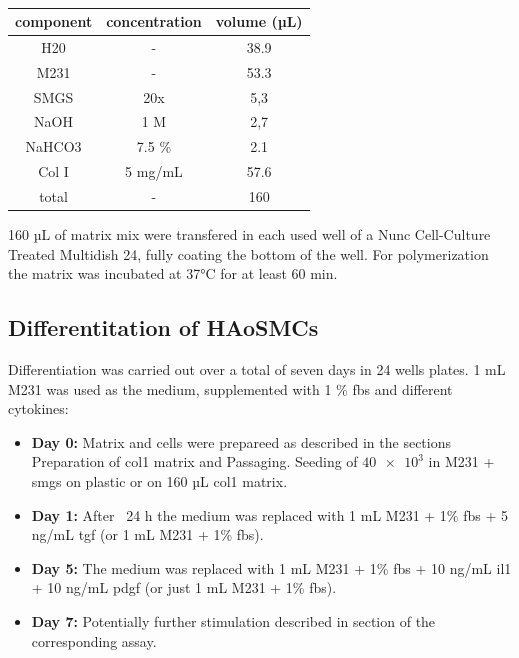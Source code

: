     \begin{table}[h]
    \capstart
	\centering
	\begin{minipage}{\captionwidth}
	   	\caption[Col I matrix]{}
	   	\label{tab:qPCR_samples}
	\end{minipage}
    \begin{tabular}{|c|c|c|}
        \hline
        component & concentration & volume (µL) \\ \hline
        H20       & -             & 38.9        \\
        M231      & -             & 53.3        \\
        SMGS      & 20x           & 5,3         \\
        NaOH      & 1 M           & 2,7         \\
        NaHCO3    & 7.5 \%        & 2.1         \\
        Col I     & 5 mg/mL       & 57.6        \\ \hline
        total     & -             & 160         \\ \hline
    \end{tabular}
    \end{table}

    160 µL of matrix mix were transfered in each used well of a Nunc Cell-Culture Treated Multidish 24, fully coating the bottom of the well. For polymerization the matrix was incubated at 37°C for at least 60 min.

    \subsection{Differentitation of HAoSMCs}
    \label{subsec:differentiation}
    Differentiation was carried out over a total of seven days in 24 wells plates. 1 mL M231 was used as the medium, supplemented with 1 \% \ac{fbs} and different cytokines:
    \begin{itemize}
        \item \textbf{Day 0:} Matrix and cells were prepareed as described in the sections Preparation of \ac{col1} matrix and Passaging. Seeding of $\num{40e3}$ in M231 + \ac{smgs} on plastic or on 160 µL \ac{col1} matrix.
        \item \textbf{Day 1:} After ~24 h the medium was replaced with 1 mL M231 + 1\% \ac{fbs} + 5 ng/mL \ac{tgf} (or 1 mL M231 + 1\% \ac{fbs}).
        \item \textbf{Day 5:} The medium was replaced with 1 mL M231 + 1\% \ac{fbs} + 10 ng/mL \ac{il1} + 10 ng/mL \ac{pdgf} (or just 1 mL M231 + 1\% \ac{fbs}).
        \item \textbf{Day 7:} Potentially further stimulation described in section of the corresponding assay.
    \end{itemize}

